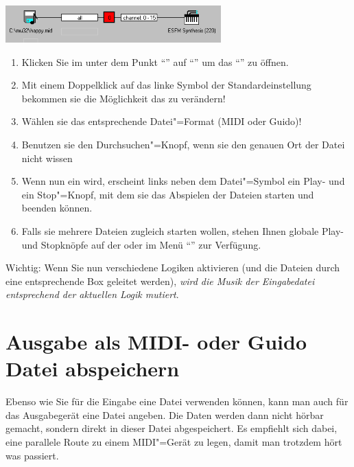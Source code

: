 \begin{center}
\ifhtml
{}
\else
\includegraphics[width=235.5pt]{cc_midiin}
\fi
\end{center}

\begin{enumerate}
\item Klicken Sie im  unter dem Punkt
  "`"' auf
  "`"' um das
  "`"' zu öffnen.
\item Mit einem Doppelklick auf das linke Symbol der
  Standardeinstellung bekommen sie die Möglichkeit das
   zu verändern!
\item Wählen sie das entsprechende Datei"=Format (MIDI oder Guido)!
\item Benutzen sie den Durchsuchen"=Knopf, wenn sie den genauen Ort
  der Datei nicht wissen
\item Wenn nun ein 
   wird, erscheint links neben
  dem Datei"=Symbol ein Play- und ein Stop"=Knopf, mit dem sie das
  Abspielen der Dateien starten und beenden können.
\item Falls sie mehrere Dateien zugleich starten wollen, stehen Ihnen
  globale Play- und Stopknöpfe auf der
   oder im Menü
  "`"' zur Verfügung.
\end{enumerate}

Wichtig: Wenn Sie nun verschiedene Logiken aktivieren (und 
die Dateien durch eine entsprechende Box geleitet werden), \emph{wird 
die Musik der Eingabedatei entsprechend der aktuellen Logik mutiert}.




\section{Ausgabe als MIDI- oder Guido Datei
  abspeichern}\label{sec:CC_MIDIOUT}




Ebenso wie Sie für die Eingabe eine Datei verwenden können, 
kann man auch für das Ausgabegerät eine Datei angeben. Die 
Daten werden dann nicht hörbar gemacht, sondern direkt in dieser 
Datei abgespeichert. Es empfiehlt sich dabei, eine parallele 
Route zu einem MIDI"=Gerät zu legen, damit man trotzdem hört 
was passiert.


